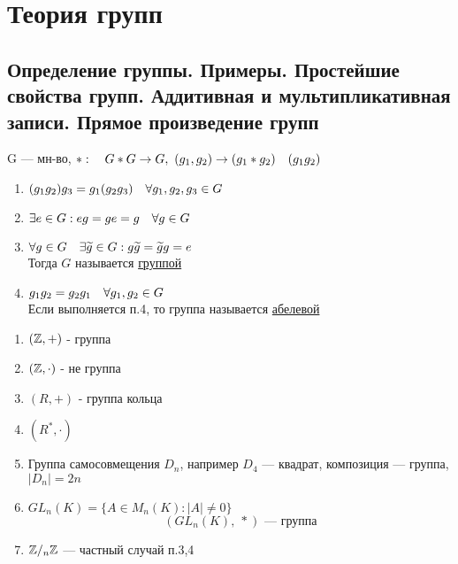 \documentclass[main]{subfiles}
\begin{document}
    \section{Теория групп}
    \subsection{Определение группы. Примеры. Простейшие свойства групп. Аддитивная и мультипликативная записи. Прямое произведение групп}

    \begin{definition}
        G --- мн-во, $*: \quad G*G \rightarrow G,\ (g_1, g_2) \rightarrow (g_1*g_2)\quad (g_1g_2)$
        \begin{enumerate}
        	\item $(g_1g_2)g_3 = g_1(g_2g_3) \quad \forall g_1, g_2, g_3 \in G$
        	\item $\exists e \in G : eg = ge = g \quad \forall g \in G$
        	\item $\forall g \in G \quad \exists \widetilde{g} \in G : g\widetilde{g} = \widetilde{g}g = e$\\
            Тогда $G$ называется \ul{группой}\\
                \hline
        	\item $g_1g_2 = g_2g_1 \quad \forall g_1, g_2 \in G$\\
            Если выполняется п.4, то группа называется \ul{абелевой}
    	\end{enumerate}
    \end{definition}

    \begin{examples}
        \begin{enumerate}
            \item $(\mathbb{Z},+)$ - группа
            \item $(\mathbb{Z}, \cdot)$ - не группа
            \item $(R, +)$ - группа кольца
            \item $(R^*, \cdot)$
            \item Группа самосовмещения $D_n$, например $D_4$ --- квадрат, композиция --- группа, $|D_n|=2n$
            \item $GL_n(K) = \{A \in M_n(K) : |A| \neq 0\}$
            \[(GL_n(K),\ *) \text{ --- группа}\]
            \item $\mathbb{Z}/_n \mathbb{Z}$ --- частный случай п.3,4
        \end{enumerate}
    \end{examples}
\end{document}
